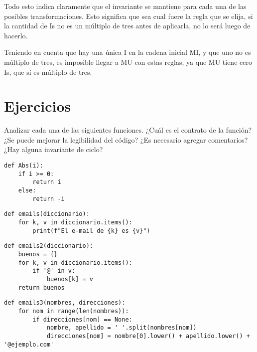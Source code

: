 \begin{subappendices}
Todo esto indica claramente que el invariante se mantiene para cada una de las
posibles transformaciones.  Esto significa que sea cual fuere la regla que se
elija, si la cantidad de Is no es un múltiplo de tres antes de aplicarla, no
lo será luego de hacerlo.

Teniendo en cuenta que hay una única I en la cadena inicial MI, y que uno no
es múltiplo de tres, es imposible llegar a MU con estas reglas, ya que MU
tiene cero Is, que sí es múltiplo de tres.
\end{subappendices}

\newpage
\section{Ejercicios}

\begin{extract*}
Analizar cada una de las siguientes funciones.
¿Cuál es el contrato de la función?
¿Se puede mejorar la legibilidad del código?
¿Es necesario agregar comentarios?
¿Hay alguna invariante de ciclo?
\end{extract*}

\begin{ejercicio}
\item \begin{verbatim}
def Abs(i):
    if i >= 0:
        return i
    else:
        return -i
\end{verbatim}
\end{ejercicio}

\begin{ejercicio}
\item \begin{verbatim}
def emails(diccionario):
    for k, v in diccionario.items():
        print(f"El e-mail de {k} es {v}")
\end{verbatim}
\end{ejercicio}

\begin{ejercicio}
\item \begin{verbatim}
def emails2(diccionario):
    buenos = {}
    for k, v in diccionario.items():
        if '@' in v:
            buenos[k] = v
    return buenos
\end{verbatim}
\end{ejercicio}

\begin{ejercicio}
\item \begin{verbatim}
def emails3(nombres, direcciones):
    for nom in range(len(nombres)):
        if direcciones[nom] == None:
            nombre, apellido = ' '.split(nombres[nom])
            direcciones[nom] = nombre[0].lower() + apellido.lower() + '@ejemplo.com'
\end{verbatim}
\end{ejercicio}

